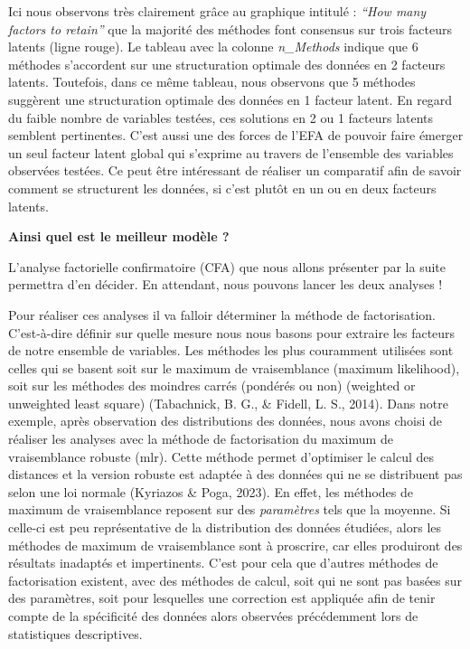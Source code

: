 \documentclass[
  french,
  11pt,
  a4paper,
]{article}
\begin{document}
Ici nous observons très clairement grâce au graphique intitulé :
\emph{``How many factors to retain''} que la majorité des méthodes font
consensus sur trois facteurs latents (ligne rouge). Le tableau avec la
colonne \emph{n\_Methods} indique que 6 méthodes s'accordent sur une
structuration optimale des données en 2 facteurs latents. Toutefois,
dans ce même tableau, nous observons que 5 méthodes suggèrent une
structuration optimale des données en 1 facteur latent. En regard du
faible nombre de variables testées, ces solutions en 2 ou 1 facteurs
latents semblent pertinentes. C'est aussi une des forces de l'EFA de
pouvoir faire émerger un seul facteur latent global qui s'exprime au
travers de l'ensemble des variables observées testées. Ce peut être
intéressant de réaliser un comparatif afin de savoir comment se
structurent les données, si c'est plutôt en un ou en deux facteurs
latents.

\textbf{Ainsi quel est le meilleur modèle ?}

L'analyse factorielle confirmatoire (CFA) que nous allons présenter par
la suite permettra d'en décider. En attendant, nous pouvons lancer les
deux analyses !

Pour réaliser ces analyses il va falloir déterminer la méthode de
factorisation. C'est-à-dire définir sur quelle mesure nous nous basons
pour extraire les facteurs de notre ensemble de variables. Les méthodes
les plus couramment utilisées sont celles qui se basent soit sur le
maximum de vraisemblance (maximum likelihood), soit sur les méthodes des
moindres carrés (pondérés ou non) (weighted or unweighted least square)
(Tabachnick, B. G., \& Fidell, L. S., 2014). Dans notre exemple, après
observation des distributions des données, nous avons choisi de réaliser
les analyses avec la méthode de factorisation du maximum de
vraisemblance robuste (mlr). Cette méthode permet d'optimiser le calcul
des distances et la version robuste est adaptée à des données qui ne se
distribuent pas selon une loi normale (Kyriazos \& Poga, 2023). En
effet, les méthodes de maximum de vraisemblance reposent sur des
\emph{paramètres} tels que la moyenne. Si celle-ci est peu
représentative de la distribution des données étudiées, alors les
méthodes de maximum de vraisemblance sont à proscrire, car elles
produiront des résultats inadaptés et impertinents. C'est pour cela que
d'autres méthodes de factorisation existent, avec des méthodes de
calcul, soit qui ne sont pas basées sur des paramètres, soit pour
lesquelles une correction est appliquée afin de tenir compte de la
spécificité des données alors observées précédemment lors de
statistiques descriptives.
\end{document}
